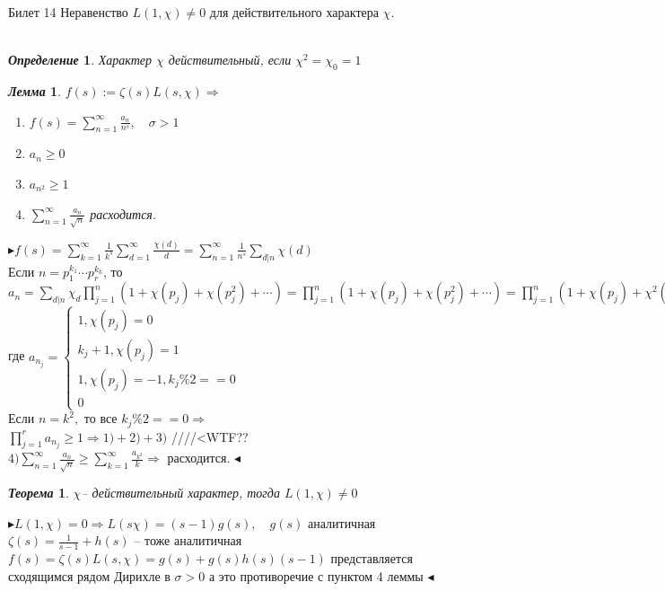 \documentclass[a4paper,12pt]{article}
\newtheorem{deff}{\textit{Определение}}
\newtheorem{teo}{\textit{Теорема}}
\newtheorem{lem}{\textit{Лемма}}
\newcommand{\q}{\quad}
\newcommand{\pb}{\blacktriangleright}
\newcommand{\pe}{\blacktriangleleft}
\newcommand{\Ra}{\Rightarrow}
\newcommand{\SL}{\sum\limits}
\begin{document}
\newpage
\begin{mybox}{\hypertarget{bil14}{Билет 14}}
Неравенство $L(1,\chi)\not=0$ для действительного характера $\chi$.\\\q\\
\begin{deff} Характер $\chi$ действительный, если $\chi^2 = \chi_0 = 1$
\end{deff}
\begin{lem} $f(s):= \zeta(s) L(s,\chi) \Ra$
\begin{enumerate}
\item $f(s) = \SL_{n=1}^\infty \frac{a_n}{n^s},\q\sigma > 1 $
\item $a_n \ge 0$
\item $a_{n^2} \ge 1$
\item $\SL_{n=1}^\infty \frac{a_n}{\sqrt{n}} $ расходится.
\end{enumerate}
\end{lem}
$\pb f(s) = \SL_{k=1}^\infty \frac{1}{k^s}  \SL_{d=1}^\infty \frac{\chi(d)}{d} = \SL_{n=1}^\infty \frac{1}{n^s} \SL_{d|n}\chi(d)$\\
Если $n = p_1^{k_1}\cdots p_r^{k_k}$, то $a_n = \SL_{d|n}\chi_d  \prod\limits_{j=1}^n (1 + \chi(p_j) + \chi(p_j^2) + \cdots)  = \prod\limits_{j=1}^n (1 + \chi(p_j) + \chi(p_j^2) + \cdots) =  \prod\limits_{j=1}^n (1 + \chi(p_j) + \chi^2(p_j) + \cdots)$\\
где $a_{n_j} = \begin{cases} 1, \chi(p_j) = 0\\k_j + 1, \chi(p_j)=1\\1, \chi(p_j) = -1, k_j\%2==0\\0  \end{cases}$\\
Если $n = k^2,$ то все $k_j \%2==0\Ra$\\
$\prod\limits_{j=1}^r  a_{n_j} \ge 1 \Ra 1)+2)+3)$ ////<WTF??\\
$4) \SL_{n=1}^\infty \frac{a_n}{\sqrt{n}} \ge \SL_{k=1}^\infty \frac{a_{k^2}}{k}  \Ra$ расходится. $\pe$

\begin{teo} $\chi$-- действительный характер, тогда $L(1, \chi) \not=0$
\end{teo}
$\pb L(1,\chi) = 0\Ra L(s\chi) = (s-1)g(s), \q g(s)$ аналитичная\\
$\zeta(s) =\frac{1}{s-1} + h(s) $ -- тоже аналитичная\\
$f(s) = \zeta(s) L(s,\chi) = g(s) + g(s)h(s)(s-1)  $ представляется сходящимся рядом Дирихле в $\sigma > 0$ а это противоречие с пунктом 4 леммы $\pe$ 
\end{mybox}
\end{document}
